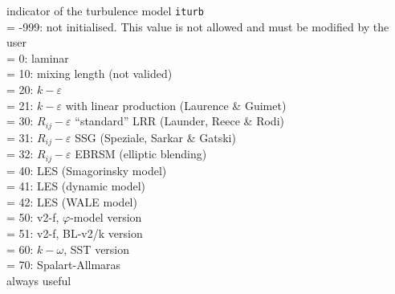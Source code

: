 {indicator of the turbulence model {\tt iturb}\\
\hspace*{1.3cm}= -999: not initialised. This value is not allowed and
must be modified by the user\\
\hspace*{1.3cm}= 0: laminar\\
\hspace*{1.3cm}= 10: mixing length (not valided)\\
\hspace*{1.3cm}= 20: $k-\varepsilon$\\
\hspace*{1.3cm}= 21: $k-\varepsilon$ with linear production (Laurence \& Guimet)\\
\hspace*{1.3cm}= 30: $R_{ij}-\varepsilon$ ``standard'' LRR (Launder, Reece \& Rodi)\\
\hspace*{1.3cm}= 31: $R_{ij}-\varepsilon$ SSG (Speziale, Sarkar \& Gatski)\\
\hspace*{1.3cm}= 32: $R_{ij}-\varepsilon$ EBRSM (elliptic blending)\\
\hspace*{1.3cm}= 40: LES (Smagorinsky model) \\
\hspace*{1.3cm}= 41: LES (dynamic model) \\
\hspace*{1.3cm}= 42: LES (WALE model) \\
\hspace*{1.3cm}= 50: v2-f, $\varphi$-model version\\
\hspace*{1.3cm}= 51: v2-f, BL-v2/k version\\
\hspace*{1.3cm}= 60: $k-\omega$, SST version \\
\hspace*{1.3cm}= 70: Spalart-Allmaras \\
always useful}

